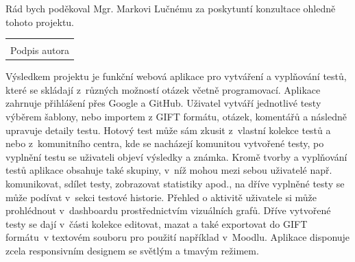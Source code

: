 \documentclass[12pt, a4paper,
openright
]{report}
\newcommand\datumOdevzdani{1. 1. 2024} %
\begin{document}
\cleardoublepage %
	

	
	\noindent Rád bych poděkoval Mgr. Markovi Lučnému za poskytuntí konzultace ohledně tohoto projektu.
	
	\vspace*{0.7\textheight} %

	\vfill
	\noindent{V Opavě \datumOdevzdani\\}
	\noindent
	\begin{minipage}{\linewidth}
		\hspace{9.5cm} 
		\begin{tabular}{@{}p{6cm}@{}}
			\dotfill \\
			Podpis autora
		\end{tabular}
	\end{minipage}
	
	\cleardoublepage %


	\noindent Výsledkem projektu je funkční webová aplikace pro vytváření a vyplňování testů, které se skládají z~různých možností otázek včetně programovací. Aplikace zahrnuje přihlášení přes Google a GitHub. Uživatel vytváří jednotlivé testy výběrem šablony, nebo importem z GIFT formátu, otázek, komentářů a následně upravuje detaily testu. Hotový test může sám zkusit z~vlastní kolekce testů a nebo z~komunitního centra, kde se nacházejí komunitou vytvořené testy, po vyplnění testu se uživateli objeví výsledky a známka. Kromě tvorby a vyplňování testů aplikace obsahuje také skupiny, v~níž mohou mezi sebou uživatelé např. komunikovat, sdílet testy, zobrazovat statistiky apod., na dříve vyplněné testy se může podívat v~sekci testové historie. Přehled o aktivitě uživatele si může prohlédnout v~dashboardu prostřednictvím vizuálních grafů. Dříve vytvořené testy se dají v~části kolekce editovat, mazat a také exportovat do GIFT formátu~v textovém souboru pro použití například v~Moodlu. Aplikace disponuje zcela responsivním designem se světlým a tmavým režimem.
	
\end{document}

